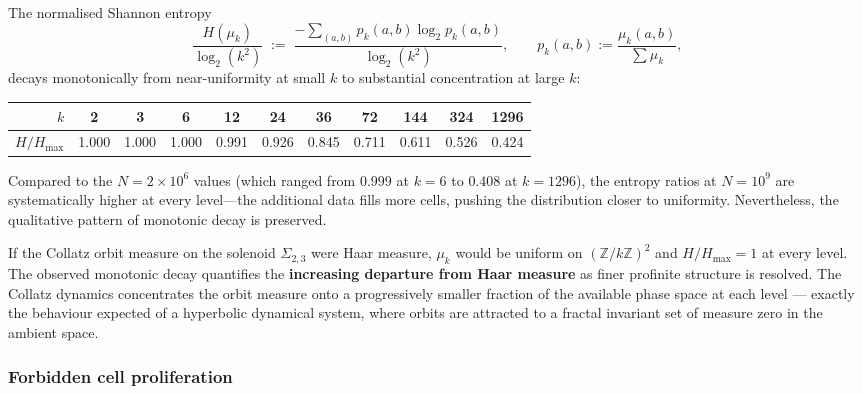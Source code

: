 \documentclass[11pt,a4paper]{article}
\newcommand{\Z}{\mathbb{Z}}
\theoremstyle{plain}
\theoremstyle{definition}
\begin{document}
\begin{empirical}
\label{obs:entropy}
    The normalised Shannon entropy
    \begin{equation}
        \frac{H(\mu_k)}{\log_2(k^2)} \;:=\;
        \frac{-\sum_{(a,b)} p_k(a,b) \log_2 p_k(a,b)}{\log_2(k^2)},
        \qquad p_k(a,b) := \frac{\mu_k(a,b)}{\sum \mu_k},
    \end{equation}
    decays monotonically from near-uniformity at small $k$ to
    substantial concentration at large $k$:
    \begin{center}
    \renewcommand{\arraystretch}{1.15}
    \begin{tabular}{rcccccccccc}
        \toprule
        $k$ & 2 & 3 & 6 & 12 & 24 & 36 & 72 & 144 & 324 & 1296 \\
        \midrule
        $H/H_{\max}$ & 1.000 & 1.000 & 1.000 & 0.991 & 0.926
                      & 0.845 & 0.711 & 0.611 & 0.526 & 0.424 \\
        \bottomrule
    \end{tabular}
    \end{center}
    Compared to the $N = 2 \times 10^6$ values (which ranged from
    $0.999$ at $k = 6$ to $0.408$ at $k = 1296$), the entropy ratios
    at $N = 10^9$ are systematically higher at every level---the
    additional data fills more cells, pushing the distribution closer
    to uniformity.  Nevertheless, the qualitative pattern of monotonic
    decay is preserved.
\end{empirical}

\begin{keyinsight}
    If the Collatz orbit measure on the solenoid $\Sigma_{2,3}$ were
    Haar measure, $\mu_k$ would be uniform on $(\Z/k\Z)^2$ and
    $H/H_{\max} = 1$ at every level.  The observed monotonic decay
    quantifies the \textbf{increasing departure from Haar measure}
    as finer profinite structure is resolved.  The Collatz dynamics
    concentrates the orbit measure onto a progressively smaller
    fraction of the available phase space at each level --- exactly the
    behaviour expected of a hyperbolic dynamical system, where orbits
    are attracted to a fractal invariant set of measure zero in the
    ambient space.
\end{keyinsight}


\subsubsection{Forbidden cell proliferation}
\end{document}
